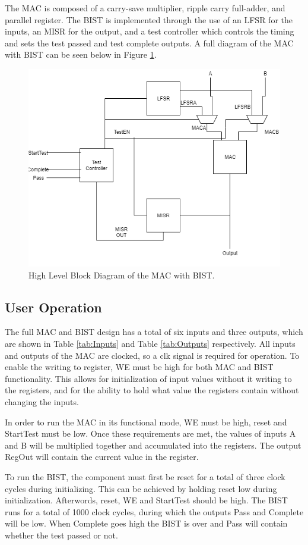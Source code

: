 \documentclass[11pt]{article}
\begin{document}
	The MAC is composed of a carry-save multiplier, ripple carry full-adder, and parallel register. The BIST is implemented through the use of an LFSR for the inputs, an MISR for the output, and a test controller which controls the timing and sets the test passed and test complete outputs. A full diagram of the MAC with BIST can be seen below in Figure \ref{fig:full-project-block}.
	
	\begin{figure}[H]
		\centering
		\includegraphics[width=0.7\linewidth]{Pictures/Full-Project-Block}
		\caption{High Level Block Diagram of the MAC with BIST.}
		\label{fig:full-project-block}
	\end{figure}


	\subsection{User Operation}
		The full MAC and BIST design has a total of six inputs and three outputs, which are shown in Table \ref{tab:Inputs} and Table \ref{tab:Outputs} respectively. All inputs and outputs of the MAC are clocked, so a clk signal is required for operation. To enable the writing to register, WE must be high for both MAC and BIST functionality. This allows for initialization of input values without it writing to the registers, and for the ability to hold what value the registers contain without changing the inputs. 
		
		In order to run the MAC in its functional mode, WE must be high, reset and StartTest must be low. Once these requirements are met, the values of inputs A and B will be multiplied together and accumulated into the registers. The output RegOut will contain the current value in the register.
		
		To run the BIST, the component must first be reset for a total of three clock cycles during initializing. This can be achieved by holding reset low during initialization. Afterwords, reset, WE and StartTest should be high. The BIST runs for a total of 1000 clock cycles, during which the outputs Pass and Complete will be low. When Complete goes high the BIST is over and Pass will contain whether the test passed or not.
		
\end{document}

